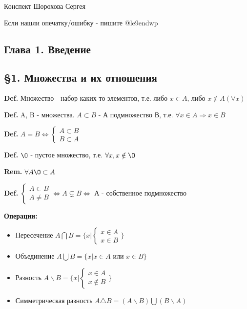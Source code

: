 \documentclass[14pt, letter paper]{article}
\begin{document}
\begin{flushright}
    Конспект Шорохова Сергея

    Если нашли опечатку/ошибку - пишите @le9endwp
\end{flushright}

\begin{center}
    \section*{Глава 1. Введение}

    \subsection*{\S 1. Множества и их отношения}
\end{center}


\textbf{Def.} Множество - набор каких-то элементов, т.е. либо $x \in A$, либо $x \notin A (\forall x)$

\textbf{Def.} A, B - множества. $A \subset B$ - А подмножество В, т.е. $\forall x \in A \Rightarrow x \in B$

\textbf{Def.} $A = B \Leftrightarrow \begin{cases} A \subset B \\ B \subset A \end{cases}$

\textbf{Def.} $\O$ - пустое множество, т.е. $\forall x, x \notin \O$

\textbf{Rem.} $\forall A \O \subset A$

\textbf{Def.} $\begin{cases} A \subset B \\ A \neq B \end{cases} \Leftrightarrow A \subsetneq B \Leftrightarrow$ А - собственное подмножество

\textbf{Операции:}
\begin{itemize}
    \item Пересечение $A \bigcap B = \{ x | \begin{cases} x \in A \\ x \in B \end{cases} \}$
    \item Объединение $A \bigcup B = \{x | x \in A$ или $x \in B \}$
    \item Разность $A \backslash B = \{x | \begin{cases} x \in A \\ x \notin B \end{cases} \}$
    \item Симметрическая разность $A \triangle B = (A \backslash B) \bigcup (B \backslash A)$
\end{itemize}
\end{document}
